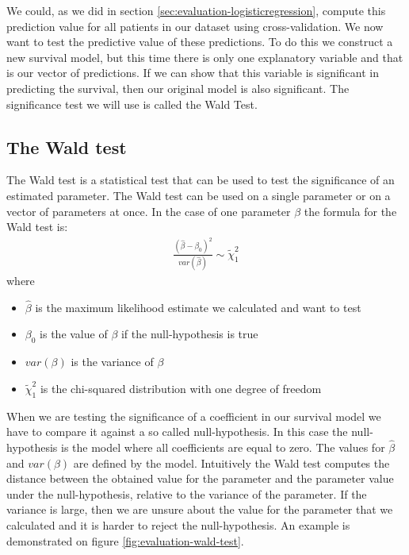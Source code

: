  We could, as we did in section \ref{sec:evaluation-logisticregression}, compute this prediction value for all patients in our dataset using cross-validation. We now want to test the predictive value of these predictions. To do this we construct a new survival model, but this time there is only one explanatory variable and that is our vector of predictions. If we can show that this variable is significant in predicting the survival, then our original model is also significant. The significance test we will use is called the Wald Test.
 
 \subsection{The Wald test}
The Wald test\cite{wikiwald} is a statistical test that can be used to test the significance of an estimated parameter. The Wald test can be used on a single parameter or on a vector of parameters at once. In the case of one parameter $\beta$ the formula for the Wald test is:
\begin{equation}
\begin{split}
\frac{(\hat{\beta}-\beta_{0})^{2}}{var(\hat{\beta})} \sim \tilde{\chi}^{2}_{1}
\end{split}
\end{equation}
where
\begin{itemize}
	\item $\hat{\beta}$ is the maximum likelihood estimate we calculated and want to test
	\item $\beta_{0}$ is the value of $\beta$ if the null-hypothesis is true
	\item $var(\beta)$ is the variance of $\beta$
	\item $\tilde{\chi}^{2}_{1}$ is the chi-squared distribution with one degree of freedom
\end{itemize}
When we are testing the significance of a coefficient in our survival model we have to compare it against a so called null-hypothesis. In this case the null-hypothesis is the model where all coefficients are equal to zero. The values for $\hat{\beta}$ and $var(\beta)$ are defined by the model. Intuitively the Wald test computes the distance between the obtained value for the parameter and the parameter value under the null-hypothesis, relative to the variance of the parameter. If the variance is large, then we are unsure about the value for the parameter that we calculated and it is harder to reject the null-hypothesis. An example is demonstrated on figure \ref{fig:evaluation-wald-test}. \\ \\
